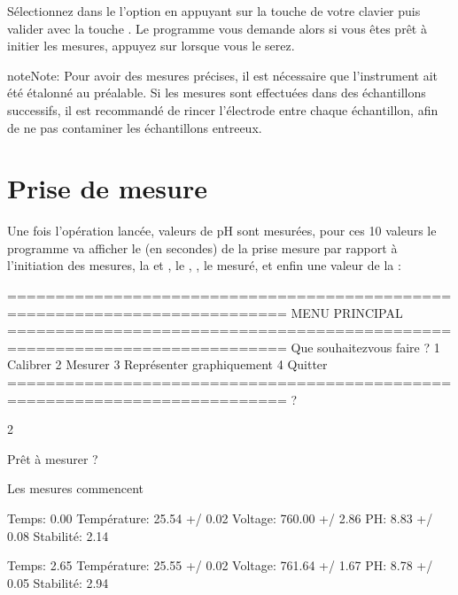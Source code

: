 \documentclass[letterpaper,10pt,french]{sphinxmanual}
\begin{document}
\sphinxAtStartPar
Sélectionnez dans le  l’option  en appuyant sur la touche  de votre clavier
puis valider avec la touche .
Le programme vous demande alors si vous êtes prêt à initier les mesures, appuyez sur  lorsque vous le serez.

\begin{sphinxadmonition}{note}{Note:}
\sphinxAtStartPar
Pour avoir des mesures précises, il est nécessaire que l’instrument ait été étalonné au préalable. Si les mesures sont effectuées dans des échantillons
successifs, il est recommandé de rincer l’électrode entre chaque échantillon, afin de ne pas contaminer
les échantillons entre\sphinxhyphen{}eux.
\end{sphinxadmonition}


\section{Prise de mesure}
\label{\detokenize{mesure:prise-de-mesure}}
\sphinxAtStartPar
Une fois l’opération lancée,  valeurs de pH sont mesurées, pour ces 10 valeurs le programme va afficher
le  (en secondes) de la prise mesure par rapport à l’initiation des mesures, la 
et , le , , le  mesuré,  et enfin une valeur de la :

\begin{sphinxVerbatim}[commandchars=\\\{\}]
===========================================================================
MENU PRINCIPAL
===========================================================================
Que souhaitez\PYGZhy{}vous faire ?
1 \PYGZhy{} Calibrer
2 \PYGZhy{} Mesurer
3 \PYGZhy{} Représenter graphiquement
4 \PYGZhy{} Quitter
===========================================================================
?

\PYGZhy{}\PYGZgt{} 2

Prêt à mesurer ?

Les mesures commencent

Temps: 0.00
Température: 25.54 +/\PYGZhy{} 0.02
Voltage: 760.00 +/\PYGZhy{} 2.86
PH: 8.83 +/\PYGZhy{} 0.08
Stabilité: 2.14

Temps: 2.65
Température: 25.55 +/\PYGZhy{} 0.02
Voltage: 761.64 +/\PYGZhy{} 1.67
PH: 8.78 +/\PYGZhy{} 0.05
Stabilité: 2.94
\end{sphinxVerbatim}
\end{document}
